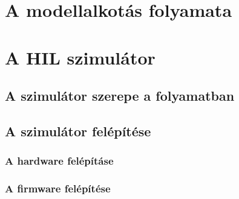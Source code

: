 \chapter{A modellalkotás folyamata}

\chapter{A HIL szimulátor}
\section{A szimulátor szerepe a folyamatban}
\section{A szimulátor felépítése}
\subsection{A hardware felépításe}
\subsection{A firmware felépítése}
